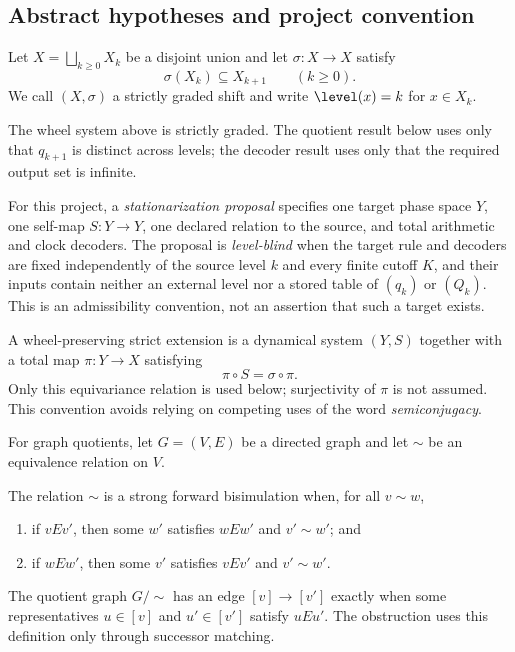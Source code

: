 \subsection{Abstract hypotheses and project convention}

\begin{definition}
Let $X=\bigsqcup_{k\geq0}X_k$ be a disjoint union and let
$\sigma:X\to X$ satisfy
\begin{equation}
  \sigma(X_k)\subseteq X_{k+1}
  \qquad(k\geq0).
  \label{eq:strict-grading}
\end{equation}
We call $(X,\sigma)$ a strictly graded shift and write
$\level(x)=k$ for $x\in X_k$.
\end{definition}

The wheel system above is strictly graded.  The quotient result below uses
only that $q_{k+1}$ is distinct across levels; the decoder result uses only
that the required output set is infinite.

\begin{definition}
\label{def:stationarization}
For this project, a \emph{stationarization proposal} specifies one target
phase space $Y$, one self-map $S:Y\to Y$, one declared relation to the source,
and total arithmetic and clock decoders.  The proposal is \emph{level-blind}
when the target rule and decoders are fixed independently of the source level
$k$ and every finite cutoff $K$, and their inputs contain neither an external
level nor a stored table of $(q_k)$ or $(Q_k)$.  This is an admissibility
convention, not an assertion that such a target exists.
\end{definition}

\begin{definition}
A wheel-preserving strict extension is a dynamical system $(Y,S)$ together
with a total map $\pi:Y\to X$ satisfying
\begin{equation}
  \pi\circ S=\sigma\circ\pi.
  \label{eq:semiconjugacy}
\end{equation}
Only this equivariance relation is used below; surjectivity of $\pi$ is not
assumed.  This convention avoids relying on competing uses of the word
\emph{semiconjugacy}.
\end{definition}

For graph quotients, let $G=(V,E)$ be a directed graph and let $\sim$ be an
equivalence relation on $V$.

\begin{definition}
The relation $\sim$ is a strong forward bisimulation when, for all
$v\sim w$,
\begin{enumerate}[label=(\roman*)]
  \item if $vEv'$, then some $w'$ satisfies $wEw'$ and $v'\sim w'$; and
  \item if $wEw'$, then some $v'$ satisfies $vEv'$ and $v'\sim w'$.
\end{enumerate}
The quotient graph $G/{\sim}$ has an edge $[v]\to[v']$ exactly when some
representatives $u\in[v]$ and $u'\in[v']$ satisfy $uEu'$.  The obstruction
uses this definition only through successor matching.
\end{definition}

